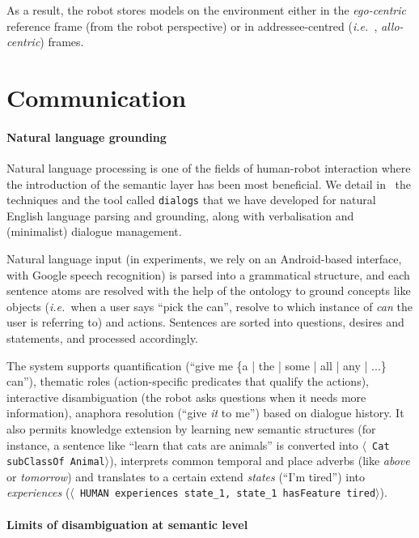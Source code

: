 \documentclass[letterpaper, 10 pt, conference]{ieeeconf}  %
\newcommand{\stmt}[1]{{\footnotesize \tt $\langle$ #1\relax$\rangle$}}
\newcommand{\ie}{{\textit{i.e.\ }}}
\begin{document}
As a result, the robot stores models on the environment either in the
\emph{ego-centric} reference frame (from the robot perspective) or in
addressee-centred (\ie, \emph{allo-centric}) frames.


\section{Communication}
\label{sect|com}

\paragraph*{Natural language grounding}

Natural language processing is one of the fields of human-robot interaction
where the introduction of the semantic layer has been most beneficial.
We detail in~\cite{Lemaignan2011a} the techniques and the tool called
\texttt{dialogs} that we have developed for natural English language parsing and
grounding, along with verbalisation and (minimalist) dialogue management.

Natural language input (in experiments, we rely on an Android-based interface,
with Google speech recognition) is parsed into a grammatical structure, and
each sentence atoms are resolved with the help of the ontology to ground
concepts like objects (\ie when a user says ``pick the can'', resolve to which
instance of \emph{can} the user is referring to) and actions. Sentences are
sorted into questions, desires and statements, and processed accordingly.

The system supports quantification (``give me \{a | the | some | all | any | ...\} can''),
thematic roles (action-specific predicates that qualify the actions), interactive disambiguation (the robot asks
questions when it needs more information), anaphora resolution (``give \emph{it} to me'') based on
dialogue history. It also permits knowledge extension by learning new semantic
structures (for instance, a sentence like ``learn that cats are animals'' is
converted into \stmt{Cat subClassOf Animal}), interprets common temporal and place adverbs (like \emph{above} or \emph{tomorrow}) and translates to a certain extend \emph{states} (``I'm tired'') into
\emph{experiences} (\stmt{HUMAN experiences state\_1, state\_1 hasFeature
tired}).

\paragraph*{Limits of disambiguation at semantic level}
\end{document}
